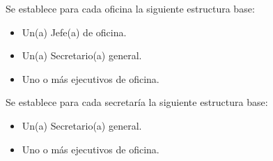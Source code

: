 Se establece para cada oficina la siguiente estructura base:
\begin{itemize}
	\item Un(a) Jefe(a) de oficina.
	\item Un(a) Secretario(a) general.
	\item Uno o más ejecutivos de oficina.
\end{itemize}

Se establece para cada secretaría la siguiente estructura base:
\begin{itemize}
	\item Un(a) Secretario(a) general.
	\item Uno o más ejecutivos de oficina.
\end{itemize}

